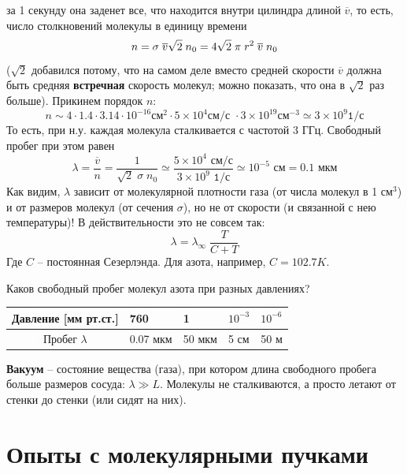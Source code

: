 за 1 секунду она заденет все, что находится внутри цилиндра длиной $\overline{v}$, то есть, число столкновений молекулы в единицу времени\vspace{-2mm}
\begin{displaymath}
n=\sigma\;\overline{v}\sqrt{2}\;n_0=4\sqrt{2}\;\pi\;r^2\;\overline{v}\;n_0
\vspace{-2mm}
\end{displaymath}
($\sqrt{2}$ добавился потому, что на самом деле вместо средней скорости $\overline{v}$ должна быть средняя {\bf встречная} скорость молекул; можно показать, что она в $\sqrt{2}$ раз больше). Прикинем порядок $n$:
\begin{displaymath}
n\sim4\cdot1.4\cdot3.14\cdot10^{-16}\texttt{см}^2\cdot5\times10^4\texttt{см/с }\cdot3\times10^{19}\texttt{см}^{-3}\simeq3\times10^9\texttt{1/с}
\end{displaymath}
То есть, при н.у. каждая молекула сталкивается с частотой 3 ГГц. Свободный пробег при этом равен
\begin{displaymath}
\lambda=\frac{\overline{v}}{n}=\frac1{\sqrt{2}\;\sigma\;n_0}\simeq
\frac{5\times10^4\texttt{ см/с}}{3\times10^9\texttt{ 1/с}}\simeq10^{-5}\texttt{ см}=0.1\texttt{ мкм}
\end{displaymath}
Как видим, $\lambda$ зависит от молекулярной плотности газа (от числа молекул в 1 см$^3$) и от размеров молекул (от сечения $\sigma$), но не от скорости (и связанной с нею температуры)! В действительности это не совсем так:
\begin{displaymath}
\lambda=\lambda_\infty\;\frac{T}{C+T}
\end{displaymath}
Где $C$ -- постоянная Сезерлэнда. Для азота, например, $C=102.7 K$.

Каков свободный пробег молекул азота при разных давлениях?
\begin{center}
\begin{tabular}{|c||p{22mm}|p{22mm}|p{22mm}|p{22mm}|}\hline
Давление [мм рт.ст.] & 760  & 1  & $10^{-3}$ & $10^{-6}$ \\ \hline \hline
Пробег $\lambda$ & 0.07 мкм & 50 мкм & 5 см & 50 м\\ \hline
\end{tabular}
\end{center}
{\bf Вакуум} -- состояние вещества (газа), при котором длина свободного пробега больше размеров сосуда: $\lambda\gg L$. Молекулы не сталкиваются, а просто летают от стенки до стенки (или сидят на них).

\section{Опыты с молекулярными пучками}

